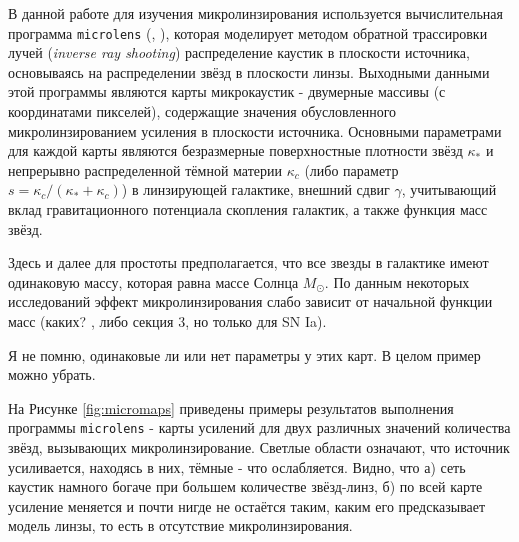 В данной работе для изучения микролинзирования используется вычислительная программа {\tt{microlens}} (\cite{wambsganss1992-microlens}, \cite{wambsganss1999}), которая моделирует методом обратной трассировки лучей (\textit{inverse ray shooting}) распределение каустик в плоскости источника, основываясь на распределении звёзд в плоскости линзы. Выходными данными этой программы являются карты микрокаустик - двумерные массивы (с координатами пикселей), содержащие значения обусловленного микролинзированием усиления в плоскости источника. Основными параметрами для каждой карты являются безразмерные поверхностные плотности звёзд $\kappa_*$ и непрерывно распределенной тёмной материи $\kappa_c$ (либо параметр $s=\kappa_c/(\kappa_*+\kappa_c)$) в линзирующей галактике, внешний сдвиг $\gamma$, учитывающий вклад гравитационного потенциала скопления галактик, а также функция масс звёзд. 




Здесь и далее для простоты предполагается, что все звезды в галактике имеют одинаковую массу, которая равна массе Солнца $M_{\odot}$. По данным некоторых  исследований эффект микролинзирования слабо зависит от начальной функции масс (каких? \cite{hubersuyu2019}, либо \cite{goldstein2018} секция 3, но только для SN Ia).


Я не помню, одинаковые ли или нет параметры у этих карт. В целом пример можно убрать.

На Рисунке \ref{fig:micromaps} приведены примеры результатов выполнения программы {\tt{microlens}} - карты усилений для двух различных значений количества звёзд, вызывающих микролинзирование. Светлые области означают, что источник усиливается, находясь в них, тёмные - что ослабляется. Видно, что а) сеть каустик намного богаче при большем количестве звёзд-линз, б) по всей карте усиление меняется и почти нигде не остаётся таким, каким его предсказывает модель линзы, то есть в отсутствие микролинзирования.

